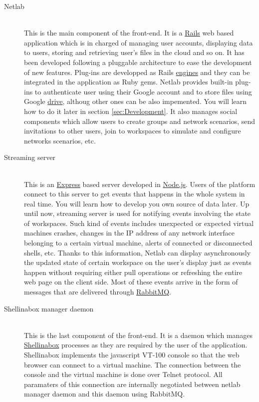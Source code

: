 \documentclass{article}
\begin{document}
\begin{description}
\item[Netlab] \hfill \\
This is the main component of the front-end. It is a \href{http://rubyonrails.org/}{Rails} web based application which is in charged of managing user accounts, displaying data to users, storing and retrieving user's files in the cloud and so on. It has been developed following a pluggable architecture to ease the development of new features. Plug-ins are developped as Rails \href{http://guides.rubyonrails.org/engines.html}{engines} and they can be integrated in the application as Ruby gems. Netlab provides built-in plug-ins to authenticate user using their Google account and to store files using Google \href{http://www.google.com/drive/about.html?usp=ad_search&gclid=CKW11vPN2bcCFQTHtAodwS4AYw}{drive}, althoug other ones can be also impemented. You will learn how to do it later in section \ref{sec:Development}. It also manages social components which allow users to create groups and network scenarios, send invitations to other users, join to workspaces to simulate and configure networks scenarios, etc.

\item[Streaming server] \hfill \\
This is an \href{http://expressjs.com/}{Express} based server developed in \href{http://nodejs.org/}{Node.js}. Users of the platform connect to this server to get events that happens in the whole system in real time. You will learn how to develop you own source of data later. Up until now, streaming server is used for notifying events involving the state of workspaces. Such kind of events includes unexpected or expected virtual machines crashes, changes in the IP address of any network interface belonging to a certain virtual machine, alerts of connected or disconnected shells, etc. Thanks to this information, Netlab can display asynchronously the updated state of certain workspace on the user's display just as events happen without requiring either pull operations or refreshing the entire web page on the client side. Most of these events arrive in the form of messages that are delivered through \href{http://www.rabbitmq.com/}{RabbitMQ}.

\item[Shellinabox manager daemon] \hfill \\
This is the last component of the front-end. It is a daemon which manages \href{http://code.google.com/p/shellinabox/}{Shellinabox} processes as they are required by the user of the application. Shellinabox implements the javascript VT-100 console so that the web browser can connect to a virtual machine. The connection between the console and the virtual machine is done over Telnet protocol. All paramaters of this connection are internally negotiated between netlab manager daemon and this daemon using RabbitMQ.


\end{description}
\end{document}
